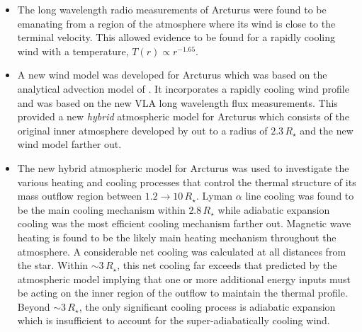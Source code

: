 \begin{itemize}
	\item The long wavelength radio measurements of Arcturus were found to be emanating from a region of the atmosphere where its wind is close to the terminal velocity. This allowed evidence to be found for a rapidly cooling wind with a temperature, $T(r) \propto r^{−1.65}$.
	
	\item A new wind model was developed for Arcturus which was based on the analytical advection model of \cite{glassgold_1986}. It incorporates a rapidly cooling wind profile and was based on the new VLA long wavelength flux measurements. This provided a new \textit{hybrid} atmospheric model for Arcturus which consists of the original inner atmosphere developed by \cite{drake_1985} out to a radius of $2.3\,R_{\star}$ and the new wind model farther out.

	\item The new hybrid atmospheric model for Arcturus was used to investigate the various heating and cooling processes that control the thermal structure of its mass outflow region between $1.2\rightarrow  10\,R_{\star}$. Lyman $\alpha$ line cooling was found to be the main cooling mechanism within $2.8\,R_{\star}$ while adiabatic expansion cooling was the most efficient cooling mechanism farther out. Magnetic wave heating is found to be the likely main heating mechanism throughout the atmosphere. A considerable net cooling was calculated at all distances from the star. Within $\sim 3\,R_{\star}$, this net cooling far exceeds that predicted by the atmospheric model implying that one or more additional energy inputs must be acting on the inner region of the outflow to maintain the thermal profile. Beyond $\sim 3\,R_{\star}$, the only significant cooling process is adiabatic expansion which is insufficient to account for the super-adiabatically cooling wind.

\end{itemize}

